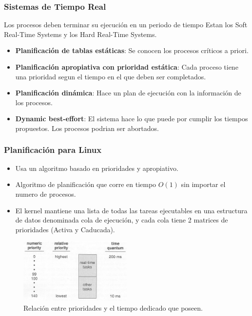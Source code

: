 \documentclass{beamer}
\newcommand{\bigO}[1]{$O({#1})$}
\begin{document}
\begin{frame}
\frametitle{Sistemas de Tiempo Real}

Los procesos deben terminar su ejecución en un periodo de tiempo
Estan los Soft Real-Time Systems y los Hard Real-Time Systems.

\begin{itemize}
	\item \textbf{Planificación de tablas estáticas}: Se conocen los procesos críticos a priori.
	
	\item \textbf{Planificación apropiativa con prioridad estática}: Cada proceso tiene una prioridad segun
	el tiempo en el que deben ser completados.
	
	\item \textbf{Planificación dinámica}: Hace un plan de ejecución con la información de los procesos.
	
	\item \textbf{Dynamic best-effort}: El sistema hace lo que puede por cumplir los tiempos propuestos. Los procesos
	podrian ser abortados.
\end{itemize}
\end{frame}


\begin{frame}
\frametitle{Planificación para Linux}

\begin{itemize}
	\item Usa un algoritmo basado en prioridades y apropiativo.
	\item Algoritmo de planificación que corre en tiempo \bigO{1} sin importar 
	el numero de procesos.
	\item El kernel mantiene una lista de todas las tareas ejecutables en una estructura de datos denominada cola de ejecución,
	y cada cola tiene 2 matrices de prioridades (Activa y Caducada).
\end{itemize}
\vspace{0.5cm}

\begin{figure}[h]
	\centering
	\includegraphics[width=0.5\textwidth]{img/5_15_PrioritiesVS_Length}
	\caption{\label{img:linux1}Relación entre prioridades y el tiempo dedicado que poseen.}
\end{figure}
\end{frame}
\end{document}
